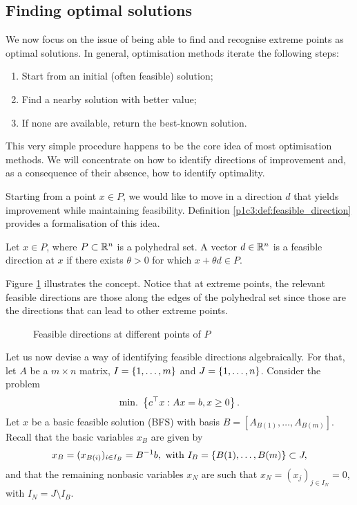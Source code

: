 \subsection{Finding optimal solutions}

We now focus on the issue of being able to find and recognise extreme points as optimal solutions. In general, optimisation methods iterate the following steps:
%
\begin{enumerate}
	\item Start from an initial (often feasible) solution;
	\item Find a nearby solution with better value;
	\item If none are available, return the best-known solution.	
\end{enumerate}
%
This very simple procedure happens to be the core idea of most optimisation methods. We will concentrate on how to identify directions of improvement and, as a consequence of their absence, how to identify optimality.

Starting from a point $x \in P$, we would like to move in a direction $d$ that yields improvement while maintaining feasibility. Definition \ref{p1c3:def:feasible_direction} provides a formalisation of this idea.

\begin{definition} \label{p1c3:def:feasible_direction}
	Let $x \in P$, where $P \subset \mathbb{R}^n$ is a polyhedral set. A vector $d \in \mathbb{R}^n$ is a feasible direction at $x$ if there exists $\theta > 0$ for which $x + \theta d \in P$.
\end{definition}

Figure \ref{p1c3:fig:feasible_directions} illustrates the concept. Notice that at extreme points, the relevant feasible directions are those along the edges of the polyhedral set since those are the directions that can lead to other extreme points.
  
\begin{figure}[h]
	\caption{Feasible directions at different points of $P$} \label{p1c3:fig:feasible_directions}
\end{figure}

Let us now devise a way of identifying feasible directions algebraically. For that, let $A$ be a $m \times n$ matrix, $I = \left\{ 1,\dots,m \right \}$ and $J = \left\{ 1,\dots,n \right \}$. Consider the problem 
%
\begin{equation*}
	\mathop{\text{min.~}} \left\{ c^\top x : Ax = b, x \geq 0 \right \}.	
\end{equation*}
%
Let $x$ be a basic feasible solution (BFS) with basis $B = [A_{B(1)}, \dots, A_{B(m)}]$. Recall that the basic variables $x_B$ are given by
%
\begin{equation*}
	x_B = (x_{B(i)})_{i \in I_B} = B^{-1}b, \text{ with } I_B = \left\{ B(1), \dots, B(m) \right \} \subset J,	
\end{equation*}
%
and that the remaining nonbasic variables $x_N$ are such that $x_N = (x_j)_{j \in I_N} = 0$, with $I_N = J \setminus I_B$.


